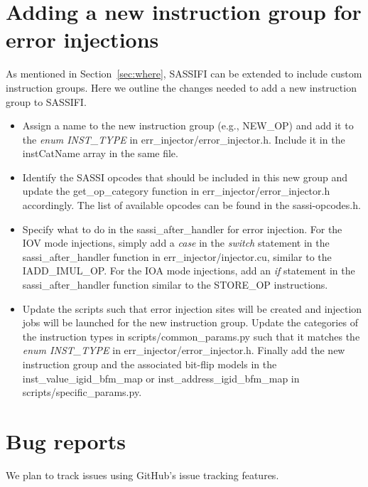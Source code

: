 \section{Adding a new instruction group for error injections}
\label{sec:new_inst_group}

As mentioned in Section~\ref{sec:where}, SASSIFI can be extended to include
custom instruction groups. Here we outline the changes needed to add a new
instruction group to SASSIFI. 

\begin{itemize}
\item Assign a name to the new instruction group (e.g., NEW\_OP) and add it to
the {\it enum INST\_TYPE} in err\_injector/error\_injector.h. Include it in the
instCatName array in the same file. 

\item Identify the SASSI opcodes that should be included in this new group and
update the get\_op\_category function in err\_injector/error\_injector.h
accordingly. The list of available opcodes can be found in the sassi-opcodes.h.

\item Specify what to do in the sassi\_after\_handler for error injection. For
the IOV mode injections, simply add a {\it case} in the
{\it switch} statement in the sassi\_after\_handler function in
err\_injector/injector.cu, similar to the IADD\_IMUL\_OP.  For the IOA mode injections, add an
{\it if} statement in the sassi\_after\_handler function similar to the STORE\_OP instructions.

\item Update the scripts such that error injection sites will be created and
injection jobs will be launched for the new instruction group. Update the
categories of the instruction types in scripts/common\_params.py such that it
matches the  {\it enum INST\_TYPE} in err\_injector/error\_injector.h.  Finally
add the new instruction group and the associated bit-flip models in the
inst\_value\_igid\_bfm\_map or inst\_address\_igid\_bfm\_map in scripts/specific\_params.py.

\end{itemize}


\section{Bug reports}

We plan to track issues using GitHub's issue tracking features.

